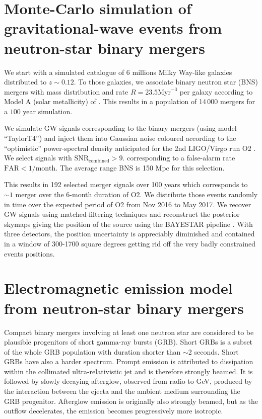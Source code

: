 \documentclass[11pt]{article}
\begin{document}
\section*{Monte-Carlo simulation of gravitational-wave events from neutron-star binary mergers}

We start with a simulated catalogue of 6 millions Milky Way-like galaxies
distributed to $z\sim 0.12$. To those galaxies, we associate binary neutron star
(BNS) mergers with mass distribution and rate $R=23.5 \mathrm{Myr}^{-3}$ per galaxy
according to Model A (solar metallicity) of
\citep{2012ApJ...759...52D}. This results in a population of 14\,000
mergers for a $100$ year simulation.

We simulate GW signals corresponding to the binary mergers (using model
``TaylorT4'') and inject them into Gaussian noise coloured according to the
``optimistic'' power-spectral density anticipated for the 2nd LIGO/Virgo run O2
\citep{2016LRR....19....1A}. We select signals with $\mathrm{SNR}_{\mathrm{combined}} > 9$.
corresponding to a false-alarm rate $\mathrm{FAR} < 1/\mathrm{month}$. The
average range BNS is 150 Mpc for this selection.

This results in 192 selected merger signals over 100 years which corresponds to
$\sim 1$ merger over the 6-month duration of O2. We distribute those events
randomly in time over the expected period of O2 from Nov 2016 to May 2017. We
recover GW signals using matched-filtering techniques and reconstruct the
posterior skymaps giving the position of the source using the BAYESTAR pipeline
\citep{2016PhRvD..93b4013S}.  With three detectors, the position uncertainty is
appreciably diminished and contained in a window of 300-1700 square degrees getting 
rid off the very badly constrained events positions. 

\section*{Electromagnetic emission model from neutron-star binary mergers}

Compact binary mergers involving at least one neutron star are considered to be
plausible progenitors of short gamma-ray bursts (GRB). Short GRBs is a
subset of the whole GRB population with duration shorter than $\sim$2
seconds. Short GRBs have also a harder spectrum. Prompt emission is attributed
to dissipation within the collimated ultra-relativistic jet and is therefore
strongly beamed. It is followed by slowly decaying afterglow, observed from
radio to GeV, produced by the interaction between the ejecta and the ambient
medium surrounding the GRB progenitor. Afterglow emission is originally also
strongly beamed, but as the outflow decelerates, the emission becomes
progressively more isotropic.
\end{document}
